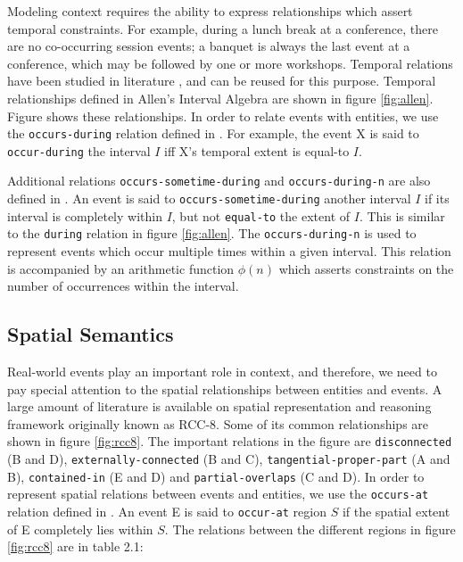 Modeling context requires the ability to express relationships which assert temporal constraints. For example, during a lunch break at a conference, there are no co-occurring session events; a banquet is always the last event at a conference, which may be followed by one or more workshops. Temporal relations have been studied in literature \cite{allen1983maintaining, wolter2000spatio}, and can be reused for this purpose. Temporal relationships defined in Allen's Interval Algebra are shown in figure \ref{fig:allen}. Figure shows these relationships. In order to relate events with entities, we use the \texttt{occurs-during} relation defined in \cite{gupta2011managing}. For example, the event X is said to \texttt{occur-during} the interval $I$ iff X's temporal extent is equal-to $I$. 

Additional relations \texttt{occurs-sometime-during} and \texttt{occurs-during-n} are also defined in \cite{gupta2011managing}. An event is said to \texttt{occurs-sometime-during} another interval $I$ if its interval is completely within $I$, but not \texttt{equal-to} the extent of $I$. This is similar to the \texttt{during} relation in figure \ref{fig:allen}. The \texttt{occurs-during-n} is used to represent events which occur multiple times within a given interval. This relation is accompanied by an arithmetic function $\phi(n)$ which asserts constraints on the number of occurrences within the interval.

\subsection{Spatial Semantics}
Real-world events play an important role in context, and therefore, we need to pay special attention to the spatial relationships between entities and events. A large amount of literature is available on spatial representation and reasoning framework originally known as RCC-8. Some of its common relationships are shown in figure \ref{fig:rcc8}. The important relations in the figure are \texttt{disconnected} (B and D), \texttt{externally-connected} (B and C), \texttt{tangential-proper-part} (A and B), \texttt{contained-in} (E and D) and \texttt{partial-overlaps} (C and D). In order to represent spatial relations between events and entities, we use the \texttt{occurs-at} relation defined in \cite{gupta2011managing}. An event E is said to \texttt{occur-at} region $S$ if the spatial extent of E completely lies within $S$. The relations between the different regions in figure \ref{fig:rcc8} are in table 2.1:

